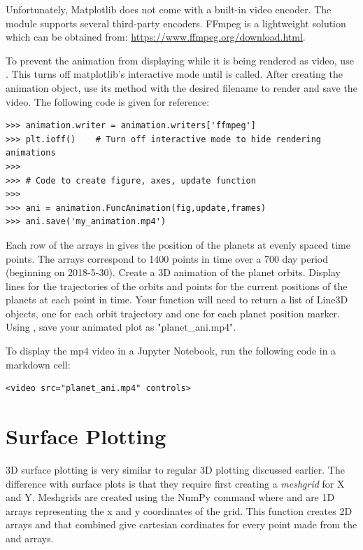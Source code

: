 Unfortunately, Matplotlib does not come with a built-in video encoder.
The  module supports several third-party encoders. FFmpeg is a lightweight solution which can be obtained from: \href{https://www.ffmpeg.org/download.html}{https://www.ffmpeg.org/download.html}.

To prevent the animation from displaying while it is being rendered as video, use .
This turns off matplotlib's interactive mode until  is called.
After creating the animation object, use its  method with the desired filename to render and save the video. The following code is given for reference:

\begin{lstlisting}
>>> animation.writer = animation.writers['ffmpeg']
>>> plt.ioff()    # Turn off interactive mode to hide rendering animations
>>>
>>> # Code to create figure, axes, update function
>>>
>>> ani = animation.FuncAnimation(fig,update,frames)
>>> ani.save('my_animation.mp4')
\end{lstlisting}

\begin{problem}
Each row of the arrays in  gives the position of the planets at evenly spaced time points. The arrays correspond to 1400 points in time over a 700 day period (beginning on 2018-5-30).
Create a 3D animation of the planet orbits.
Display lines for the trajectories of the orbits and points for the current positions of the planets at each point in time.
Your  function will need to return a list of Line3D objects, one for each orbit trajectory and one for each planet position marker.
Using , save your animated plot as "planet\_ani.mp4". 

To display the mp4 video in a Jupyter Notebook, run the following code in a markdown cell:

\begin{lstlisting}
<video src="planet_ani.mp4" controls>
\end{lstlisting}
\end{problem}

\section*{Surface Plotting}
3D surface plotting is very similar to regular 3D plotting discussed earlier.
The difference with surface plots is that they require first creating a \textit{meshgrid} for X and Y. Meshgrids are created using the NumPy command  where  and  are 1D arrays representing the x and y coordinates of the grid.
This function creates 2D arrays  and  that combined give cartesian cordinates for every point made from the  and  arrays. 

